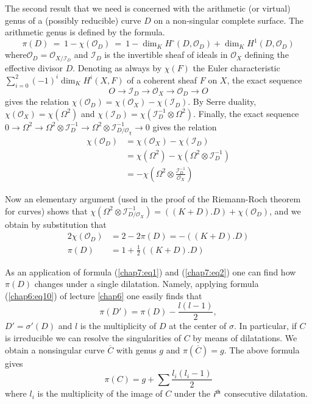 The second result that we need is concerned with the arithmetic (or
virtual) genus of a (possibly reducible) curve $D$ on a non-singular
complete surface. The arithmetic genus is defined by the formula. 
$$
\pi (D) ~ = ~ 1 - \chi (\mathscr{O}_D) ~ = ~ 1 - \dim_K H^{\circ} 
(D, \mathscr{O}_D) + \dim_K H^1 (D, \mathscr{O}_D) 
$$
where\pageoriginale $\mathscr{O}_D = \mathscr{O}_{X/\mathscr{I}_D}$
and $\mathscr{I}_D$ 
is the invertible sheaf of ideals in $\mathscr{O}_X$ defining the
effective divisor $D$. Denoting as always by $\chi(F)$ the Euler
characteristic $\sum\limits_{i=0}^{2}(-1)^i \dim_K H^i(X, F)$ of a
coherent sheaf $F$ on $X$, the exact sequence 
$$
O \to \mathscr{I}_D \to \mathscr{O}_X \to \mathscr{O}_D \to O
$$
gives the relation
$\chi(\mathscr{O}_D)=\chi(\mathscr{O}_X)-\chi(\mathscr{I}_D)$. By
Serre duality, $\chi(\mathscr{O}_X)=\chi(\Omega^2)$ and
$\chi(\mathscr{I}_D)=\chi(\mathscr{I}^{-1}_D \otimes
\Omega^2)$. Finally, the exact sequence $0 \to \Omega^2 \to \Omega^2
\otimes \mathscr{I}_D^{-1} \to \Omega^2 \otimes \mathscr{I}^{-1}_{D/
  \mathscr{O}_{\chi}} \to 0$ gives the relation 
\begin{align*}
  \chi(\mathscr{O}_D)& =\chi(\mathscr{O}_X)-\chi(\mathscr{I}_D)\\
  &=\chi(\Omega^2)-\chi(\Omega^2 \otimes \mathscr{I}^{-1}_{D})\\
  &=-\chi(\Omega^2 \otimes \frac{\mathscr{I}^{-1}_D}{\mathscr{O}_X})
\end{align*}

Now an elementary argument (used in the proof of the Riemann-Roch
theorem for curves) shows that $\chi(\Omega^2 \otimes
\mathscr{I}^{-1}_{D/\mathscr{O}_X})=((K+D).D)+\chi(\mathscr{O}_D)$,
and we obtain by substitution that 
\begin{align*}
2\chi(\mathscr{O}_D)& =2-2 \pi(D)=-((K+D).D)\\
\pi(D)& =1+\frac{1}{2}((K+D).D) \tag{2}\label{chap7:eq2}
\end{align*}

As an application of formula (\ref{chap7:eq1}) and (\ref{chap7:eq2})
one can find how $\pi(D)$ 
changes under a single dilatation. Namely, applying formula (\ref{chap6:eq10}) of
lecture \ref{chap6} one easily finds that  
$$
\pi(D')=\pi(D)-\frac{l(l-1)}{2},
$$\pageoriginale
$D'=\sigma'(D)$ and $l$ is the multiplicity of $D$ at the center of
$\sigma$. In particular, if $C$ is irreducible we can resolve the
singularities of $C$ by means of dilatations. We obtain a nonsingular
curve $\overline{C}$ with genus $g$ and $\pi(\overline{C})=g$. The
above formula gives 
$$
\pi(C)=g+\sum \frac{l_i(l_i-1)}{2}
$$
where $l_i$ is the multiplicity of the image of $C$ under the $i^{\rm th}$
consecutive dilatation. 

